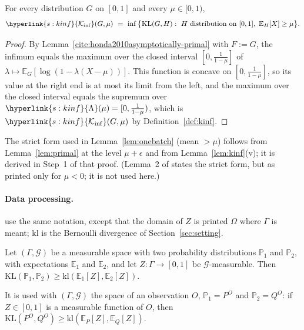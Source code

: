 \documentclass[10pt]{article}
\newcommand{\sy}[2]{{\hyperlink{#1}{#2}}}
\newcommand{\E}{\mathbb{E}}
\newcommand{\PP}{\mathbb{P}}
\newcommand{\1}{\mathbf{1}}
\newcommand{\KL}{\mathrm{KL}}
\newcommand{\kl}{\mathrm{kl}}
\newcommand{\Ki}{\sy{s:kinf}{\mathcal K_{\inf}}}
\newcommand{\Lset}[1]{\sy{s:kinf}{\Lambda}(#1)}
\begin{document}
\begin{lemma}\label{lem:primal}
For every distribution $G$ on $[0,1]$ and every $\mu\in[0,1)$,
\[
\Ki(G,\mu)\ =\ \inf\big\{\KL(G,H):\ H\text{ distribution on }[0,1],\ \E_H[X]\ge\mu\big\}.
\]
\end{lemma}
\begin{proof}
By Lemma~\ref{cite:honda2010asymptotically-primal} with $F:=G$, the infimum equals the maximum over the closed interval $[0,\frac1{1-\mu}]$ of
$\lambda\mapsto\E_G[\log(1-\lambda(X-\mu))]$. This function is concave on $[0,\frac1{1-\mu}]$, so its value at the right end is at most its limit from the left, and the
maximum over the closed interval equals the supremum over $\Lset{\mu}=[0,\frac1{1-\mu})$, which is $\Ki(G,\mu)$ by Definition~\ref{def:kinf}.
\end{proof}
\noindent The strict form used in Lemma~\ref{lem:onebatch} (mean $>\mu$) follows from Lemma~\ref{lem:primal} at the level $\mu+\epsilon$ and from
Lemma~\ref{lem:kinf}(v); it is derived in Step~1 of that proof. (Lemma~2 of \citet{HT10} states the strict form, but as printed only for $\mu<0$; it is not used here.)

\paragraph{Data processing.} \citet[Lemma~1]{GMS19} use the same notation, except that the domain of $Z$ is printed $\Omega$ where $\Gamma$ is
meant; $\kl$ is the Bernoulli divergence of Section~\ref{sec:setting}.

\begin{lemma}\label{cite:garivier2019explore-dataprocessing}
Let $(\Gamma,\mathcal G)$ be a measurable space with two probability distributions $\PP_1$ and $\PP_2$, with expectations $\E_1$ and $\E_2$, and let
$Z:\Gamma\to[0,1]$ be $\mathcal G$-measurable. Then $\KL(\PP_1,\PP_2)\ge\kl(\E_1[Z],\E_2[Z])$.
\end{lemma}
\noindent It is used with $(\Gamma,\mathcal G)$ the space of an observation $O$, $\PP_1=P^O$ and $\PP_2=Q^O$: if $Z\in[0,1]$ is a measurable function of $O$, then
$\KL(P^O,Q^O)\ge\kl(\E_P[Z],\E_Q[Z])$.
\end{document}
